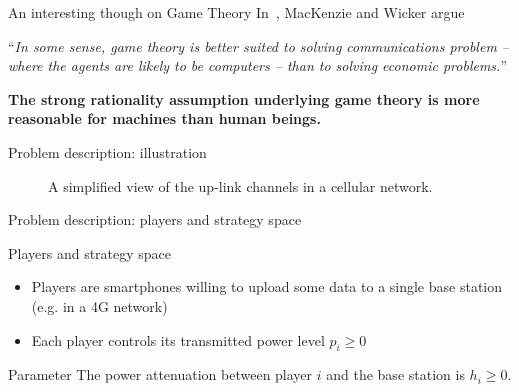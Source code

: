 \begin{frame}{An interesting though on Game Theory}
    In~\cite{mackenzie01}, MacKenzie and Wicker argue

    \begin{center}
        ``\textit{In some sense, game theory is better suited to solving communications
        problem -- where the agents are likely to be computers -- than to solving economic
        problems.}''
    \end{center}
    
    \vspace{0.5cm}
    \textbf{{\color{green}The strong rationality assumption underlying game theory is more
    reasonable for machines than human beings.}}
\end{frame}


\begin{frame}{Problem description: illustration}
    \begin{figure}
        \centering
        \caption{A simplified view of the up-link channels in a cellular network.}
    \end{figure}
\end{frame}

\begin{frame}{Problem description: players and strategy space}
    \begin{exampleblock}{Players and strategy space}
        \begin{itemize}
            \pause
            \item Players are smartphones willing to upload some data to a single base station (e.g. in
            a 4G network)
            \pause
            \item Each player controls its transmitted power level $p_i \ge 0$
        \end{itemize}
    \end{exampleblock}

    \vspace{0.5cm}
    \pause
    \begin{block}{Parameter}
        The power attenuation between player $i$ and the base station is $h_i \ge 0$.
    \end{block}
\end{frame}


